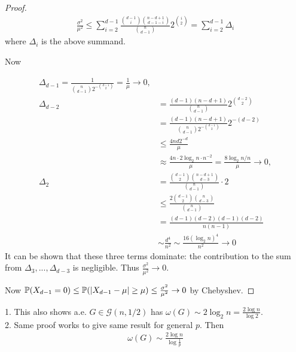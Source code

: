 \documentclass[a4paper]{article}
\begin{document}
\begin{thm}
\begin{proof}
\begin{equation*}
\begin{aligned}
\frac{\sigma^2}{\mu^2} \leq \sum_{i=2}^{d-1} \frac{{{d-1} \choose i} {{n-d+1} \choose {d-1-i}}}{{n \choose {d-1}}} 2^{{i \choose 2}} = \sum_{i=2}^{d-1} \Delta_i
\end{aligned}
\end{equation*}
where $\Delta_i$ is the above summand.

Now

\begin{equation*}
\begin{aligned}
\Delta_{d-1} = \frac{1}{{n \choose {d-1}} 2^{-{{d-1} \choose 2}}} = \frac{1}{\mu} \to 0,\\
\Delta_{d-2} &= \frac{(d-1)(n-d+1)}{{n \choose {d-1}} }2^{{d-2} \choose 2}\\
&= \frac{(d-1)(n-d+1)}{{n \choose {d-1}} 2^{-{{d-1} \choose 2}} } 2^{-(d-2)} \\
&\leq \frac{4nd 2^{-d}}{\mu}\\
&\approx \frac{4n \cdot 2\log_2 n \cdot n^{-2}}{\mu} = \frac{8\log_2 n/n}{\mu} \to 0,\\
\Delta_2 &= \frac{{{d-1}\choose 2} {{n-d+1} \choose {d-3}}}{{n \choose {d-1}}} \cdot 2\\
&\leq \frac{2{{d-1} \choose 2} {n \choose {d-3}}}{ {n \choose {d-1}}}\\
&= \frac{(d-1)(d-2)(d-1)(d-2)}{n(n-1)}\\
&\sim \frac{d^4}{n^2} \sim \frac{16(\log_2 n)^4}{n^2} \to 0
\end{aligned}
\end{equation*}
It can be shown that these three terms dominate: the contribution to the sum from $\Delta_3,...,\Delta_{d-3}$ is negligible. Thus $\frac{\sigma^2}{\mu^2} \to 0$.

Now $\P(X_{d-1} = 0) \leq \P(|X_{d-1}-\mu| \geq \mu) \leq \frac{\sigma^2}{\mu^2} \to 0$ by Chebyshev.
\end{proof}
\end{thm}

\begin{rem}
1. This also shows a.e. $G \in \mathcal{G}(n,1/2)$ has $\omega(G) \sim 2\log_2 n = \frac{2\log n}{\log 2}$.\\
2. Same proof works to give same result for general $p$. Then
\begin{equation*}
\begin{aligned}
\omega(G) \sim \frac{2\log n}{\log {\frac{1}{p}}}
\end{aligned}
\end{equation*}
\end{rem}
\end{document}
